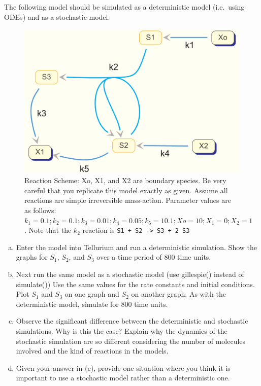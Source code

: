 \documentclass[12pt]{article}
\begin{document}
\begin{question}
The following model should be simulated as a deterministic model (i.e.\ using ODEs) and
as a stochastic model.

\begin{figure}[htb]
  \begin{center}
  \includegraphics[scale=0.2]{Howard.pdf}
  \end{center}
  \caption{Reaction Scheme: Xo, X1, and X2 are boundary species. Be very careful that you replicate this model exactly as given.
  Assume all reactions are simple irreversible mass-action. Parameter values are
  as follows: $k_1 = 0.1; k_2 = 0.1; k_3 = 0.01; k_4 = 0.05; k_5 = 10.1; Xo = 10; X_1 = 0; X_2 = 1$. Note that the $k_2$ reaction is {\tt S1 + S2 -> S3 + 2 S3}}
\end{figure}

\begin{enumerate}[a)]
\item Enter the model into Tellurium and run a deterministic simulation.
Show the graphs for $S_1$, $S_2$, and $S_3$ over a time period of 800
time units.

\item Next run the same model as a stochastic model (use gillespie() instead of simulate())
Use the same values for the rate constants and initial conditions.
Plot $S_1$ and $S_3$ on one graph and $S_2$ on another graph. As with the deterministic model, simulate for 800 time units.

\item Observe the significant difference between the deterministic and
stochastic simulations. Why is this the case? Explain why the dynamics of the stochastic
simulation are so different considering the number of
molecules involved and the kind of reactions in the models.

\item Given your answer in (c), provide one situation where you think it is important to use a
stochastic model rather than a deterministic one.
\end{enumerate}
\end{question}
\end{document}
